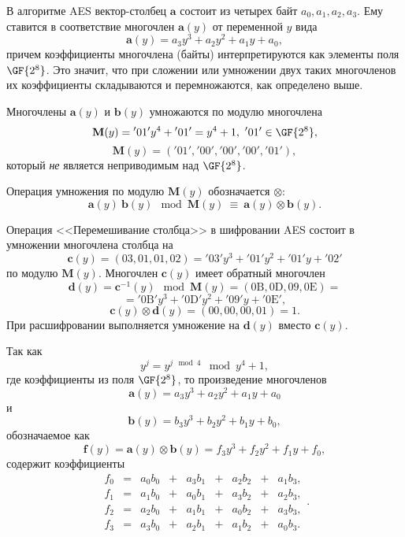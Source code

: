 В алгоритме AES вектор-столбец $\mathbf{a}$ состоит из четырех байт $a_{0}, a_{1}, a_{2}, a_{3}$. Ему ставится в соответствие многочлен $\mathbf{a}(y)$ от переменной $y$ вида
    \[ \mathbf{a}(y) = a_{3}y^{3}+a_{2}y^{2}+a_{1}y+a_{0}, \]
причем коэффициенты многочлена (байты) интерпретируются как элементы поля $\GF{2^{8}}$. Это значит, что при сложении или умножении двух таких многочленов их коэффициенты складываются и перемножаются, как определено выше.

Многочлены $\mathbf{a}(y)$ и $\mathbf{b}(y)$ умножаются по модулю многочлена
    \[ \mathbf{M}(y)= \mathrm{'01'} y^4 + \mathrm{'01'} = y^4 + 1, ~ \mathrm{'01'} \in \GF{2^8}, \]
    \[ \mathbf{M}(y)= (\mathrm{'01'}, \mathrm{'00'},\mathrm{'00'}, \mathrm{'00'}, \mathrm{'01'}), \]
который \emph{не} является неприводимым над $\GF{2^8}$.

Операция умножения по модулю $\mathbf{M}(y)$  обозначается $\otimes$:
    \[ \mathbf{a}(y) ~ \mathbf{b}(y) \mod \mathbf{M}(y) ~\equiv~ \mathbf{a}(y) \otimes \mathbf{b}(y). \]

Операция <<Перемешивание столбца>> в шифровании AES состоит в умножении многочлена столбца на
    \[ \mathbf{c}(y) = (03, 01, 01, 02) = \mathrm{'03'} y^3 + \mathrm{'01'} y^2 + \mathrm{'01'} y + \mathrm{'02'} \]
по модулю $\mathbf{M}(y)$. Многочлен $\mathbf{c}(y)$ имеет обратный многочлен
    \[ \mathbf{d}(y) = \mathbf{c}^{-1}(y) \mod \mathbf{M}(y) = (\mathrm{0B}, \mathrm{0D}, \mathrm{09}, \mathrm{0E}) = \]
        \[ = \mathrm{'0B'} y^3 + \mathrm{'0D'} y^2 + \mathrm{'09'} y + \mathrm{'0E'}, \]
    \[ \mathbf{c}(y) \otimes \mathbf{d}(y) = (00, 00, 00, 01) = 1. \]
При расшифровании выполняется умножение на $\mathbf{d}(y)$ вместо $\mathbf{c}(y)$.

Так как
    \[ y^j = y^{j \mod 4} \mod y^4+1, \]
где коэффициенты из поля $\GF{2^8}$, то произведение многочленов
    \[ \mathbf{a}(y) = a_{3}y^{3}+ a_{2}y^{2} + a_{1}y + a_{0} \]
и
    \[ \mathbf{b}(y) = b_{3}y^{3} + b_{2}y^{2} + b_{1}y + b_{0}, \]
обозначаемое как
    \[ \mathbf{f}(y) = \mathbf{a}(y) \otimes \mathbf{b}(y) = f_{3}y^{3} + f_{2}y^{2} + f_{1}y + f_{0}, \]
содержит коэффициенты
\[
    \begin{array}{ccccccccc}
        f_{0} & = & a_{0}b_{0} & + & a_{3}b_{1} & + & a_{2}b_{2} & + & a_{1}b_{3}, \\
        f_{1} & = & a_{1}b_{0} & + & a_{0}b_{1} & + & a_{3}b_{2} & + & a_{2}b_{3}, \\
        f_{2} & = & a_{2}b_{0} & + & a_{1}b_{1} & + & a_{0}b_{2} & + & a_{3}b_{3}, \\
        f_{3} & = & a_{3}b_{0} & + & a_{2}b_{1} & + & a_{1}b_{2} & + &  a_{0}b_{3}.
    \end{array}.
\]

